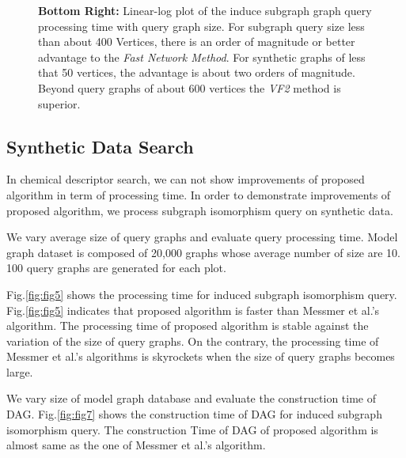 \begin{figure}[h]
{\textbf{Bottom Right:} Linear-log plot of the induce subgraph graph query processing time with query graph size. For subgraph query size less than about 400 Vertices, there is an order of magnitude or better advantage to the \textit{Fast Network Method}. For synthetic graphs of less that 50 vertices, the advantage is about two orders of magnitude. Beyond query graphs of about 600 vertices the \textit{VF2} method is superior.
}
\label{fig:fig91}
\end{figure}
%

\subsection{Synthetic Data Search}
In chemical descriptor search, we can not show improvements of proposed algorithm in term of processing time.
In order to demonstrate improvements of proposed algorithm, we process subgraph isomorphism query on synthetic data.

We vary average size of query graphs and evaluate query processing time.
Model graph dataset is composed of 20,000 graphs whose average number of size are 10.
100 query graphs are generated for each plot.



Fig.\ref{fig:fig5} shows the processing time for induced subgraph isomorphism query.
Fig.\ref{fig:fig5} indicates that proposed algorithm is faster than Messmer et al.'s algorithm.
The processing time of proposed algorithm is stable against the variation of the size of query graphs.
On the contrary, the processing time of Messmer et al.'s algorithms is skyrockets when the size of query graphs becomes large.


%



We vary size of model graph database and evaluate the construction time of DAG.
Fig.\ref{fig:fig7} shows the construction time of DAG for induced subgraph isomorphism query.
The construction Time of DAG of proposed algorithm is almost same as the one of Messmer et al.'s algorithm.

